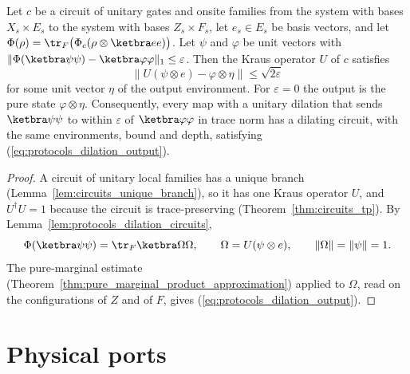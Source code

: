\begin{theorem}
    \label{thm:protocols_dilation_output}
    \leanok
    Let $c$ be a circuit of unitary gates and onsite families from the system with bases
    $X_s\times E_s$ to the system with bases $Z_s\times F_s$, let $e_s\in E_s$ be basis
    vectors, and let $\Phi(\rho)=\tr_F\bigl(\Phi_c(\rho\otimes\ketbra ee)\bigr)$. Let $\psi$ and
    $\varphi$ be unit vectors with $\lVert\Phi(\ketbra\psi\psi)-\ketbra\varphi\varphi\rVert_1\le
    \varepsilon$. Then the Kraus operator $U$ of $c$ satisfies
    \begin{equation}
        \lVert U(\psi\otimes e)-\varphi\otimes\eta\rVert\le\sqrt{2\varepsilon}
        \label{eq:protocols_dilation_output}
    \end{equation}
    for some unit vector $\eta$ of the output environment. For $\varepsilon=0$ the output is
    the pure state $\varphi\otimes\eta$. Consequently, every map with a unitary dilation that
    sends $\ketbra\psi\psi$ to within $\varepsilon$ of $\ketbra\varphi\varphi$ in trace norm
    has a dilating circuit, with the same environments, bound and depth, satisfying
    (\ref{eq:protocols_dilation_output}).
\end{theorem}
\begin{proof}\leanok
    A circuit of unitary local families has a unique branch
    (Lemma~\ref{lem:circuits_unique_branch}), so it has one Kraus operator $U$, and
    $U^\dagger U=1$ because the circuit is trace-preserving (Theorem~\ref{thm:circuits_tp}).
    By Lemma~\ref{lem:protocols_dilation_circuits},
    \begin{equation}
        \Phi(\ketbra\psi\psi)=\tr_F\ketbra\Omega\Omega,\qquad
        \Omega=U(\psi\otimes e),\qquad\lVert\Omega\rVert=\lVert\psi\rVert=1.
        \notag
    \end{equation}
    The pure-marginal estimate (Theorem~\ref{thm:pure_marginal_product_approximation}) applied
    to $\Omega$, read on the configurations of $Z$ and of $F$, gives
    (\ref{eq:protocols_dilation_output}).
\end{proof}

\section{Physical ports}
\label{sec:protocols_ports}

